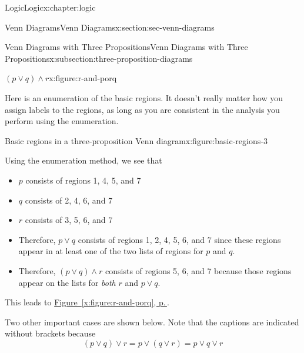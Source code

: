 \documentclass[twoside,10pt,]{book}
\newcommand{\xreffont}{\relax}
\numberwithin{equation}{section}
\begin{document}
\begin{chapterptx}{Logic}{}{Logic}{}{}{x:chapter:logic}
\begin{sectionptx}{Venn Diagrams}{}{Venn Diagrams}{}{}{x:section:sec-venn-diagrams}
\begin{subsectionptx}{Venn Diagrams with Three Propositions}{}{Venn Diagrams with Three Propositions}{}{}{x:subsection:three-proposition-diagrams}
\begin{figureptx}{\((p{\vee} q){\wedge} r\)}{x:figure:r-and-porq}{}
\begin{image}{0.3}{0.4}{0.3}%
\resizebox{\linewidth}{!}{%
\begin{venndiagram3sets}[labelA={$p$},labelB={$q$},labelC={$r$}]
  \fillACapC
  \fillBCapC
\end{venndiagram3sets}
}%
\end{image}%
\tcblower
\end{figureptx}%
%
\par
Here is an enumeration of the basic regions.  It doesn't really matter how you assign labels to the regions, as long as you are consistent in the analysis you perform using the enumeration.%
\par
\begin{figureptx}{Basic regions in a three-proposition Venn diagram}{x:figure:basic-regions-3}{}%
\begin{image}{0.3}{0.4}{0.3}%
\resizebox{\linewidth}{!}{%
\begin{venndiagram3sets}[labelA={$p$},labelB={$q$},labelC={$r$},labelOnlyA={1},labelOnlyB={2},labelOnlyC={3},labelOnlyAB={4},labelOnlyAC={5},labelOnlyBC={6},labelABC={7},labelNotABC={8}]
\end{venndiagram3sets}
}%
\end{image}%
\tcblower
\end{figureptx}%
%
\par
Using the enumeration method, we see that%
\begin{itemize}[label=\textbullet]
\item{}\(p\) consists of regions 1, 4, 5, and 7%
\item{}\(q\) consists of 2, 4, 6, and 7%
\item{}\(r\) consists of 3, 5, 6, and 7%
\item{}Therefore, \(p{\vee} q\) consists of regions 1, 2, 4, 5, 6, and 7 since these regions appear in at least one of the two lists of regions for \(p\) and \(q\).%
\item{}Therefore, \((p{\vee} q){\wedge} r\) consists of regions 5, 6, and 7 because those regions appear on the lists for \emph{both} \(r\) and \(p{\vee} q\).%
\end{itemize}
This leads to \hyperref[x:figure:r-and-porq]{Figure~{\xreffont\ref{x:figure:r-and-porq}}, p.\,\pageref{x:figure:r-and-porq}}.%
\par
Two other important cases are shown below.  Note that the captions are indicated without brackets because%
\begin{equation*}
(p{\vee} q){\vee} r=p{\vee}(q{\vee} r)=p{\vee} q{\vee} r

\end{equation*}
\end{subsectionptx}
\end{sectionptx}
\end{chapterptx}
\end{document}
